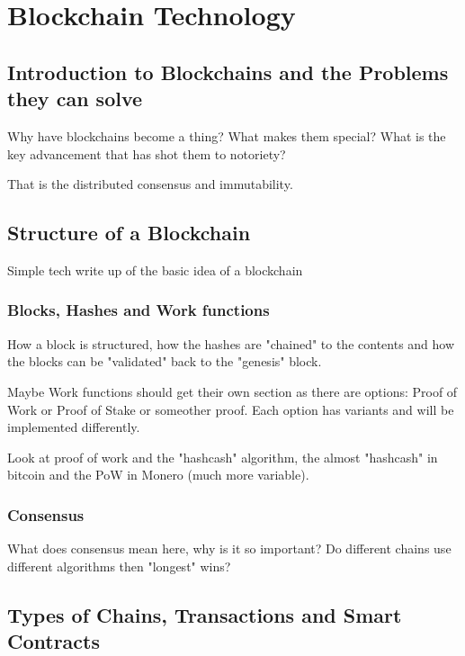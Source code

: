 
\chapter{Blockchain Technology}
\label{ch:blockchain}

\section{Introduction to Blockchains and the Problems they can solve}
\label{ch:blockchain:intro}

Why have blockchains become a thing? What makes them special? What is the key advancement that has shot them to notoriety?

That is the distributed consensus and immutability.

\section{Structure of a Blockchain}
\label{ch:blockchain:structure}

Simple tech write up of the basic idea of a blockchain

\subsection{Blocks, Hashes and Work functions}
\label{ch:blockchain:structure:basics}

How a block is structured, how the hashes are "chained" to the contents and
how the blocks can be "validated" back to the "genesis" block.

Maybe Work functions should get their own section as there are options: Proof of Work or Proof of Stake or someother proof. Each option has variants and will be implemented differently.

Look at proof of work and the "hashcash" algorithm, the almost "hashcash" in bitcoin and the PoW in Monero (much more variable).

\subsection{Consensus}
\label{ch:blockchain:structure:consensus}

What does consensus mean here, why is it so important? Do different chains use different algorithms then "longest" wins?

\section{Types of Chains, Transactions and Smart Contracts}
\label{ch:blockchain:types}

